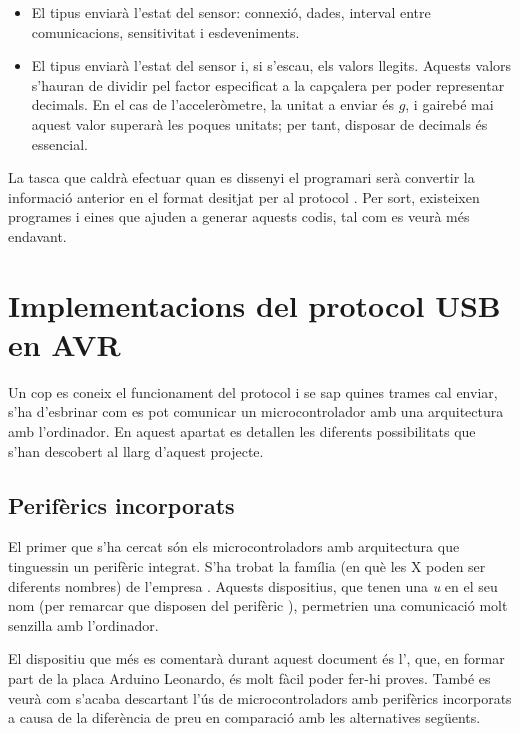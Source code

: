\begin{itemize}
    \item El tipus  enviarà l'estat del sensor: connexió, dades,
    interval entre comunicacions, sensitivitat i esdeveniments.
    \item El tipus  enviarà l'estat del sensor i, si s'escau, els
    valors llegits. Aquests valors s'hauran de dividir pel factor especificat
    a la capçalera per poder representar decimals. En el cas de l'acceleròmetre,
    la unitat a enviar és $g$, i gairebé mai aquest valor superarà
    les poques unitats; per tant, disposar de decimals és essencial.
\end{itemize}

La tasca que caldrà efectuar quan es dissenyi el programari serà convertir la
informació anterior en el format desitjat per al protocol . Per sort,
existeixen programes i eines que ajuden a generar aquests codis, tal com
es veurà més endavant.

\section{Implementacions del protocol USB en AVR}

Un cop es coneix el funcionament del protocol  i se sap quines trames
cal enviar, s'ha d'esbrinar com es pot comunicar un microcontrolador amb
una arquitectura  amb l'ordinador. En aquest apartat es detallen
les diferents possibilitats que s'han descobert al llarg d'aquest projecte.

\subsection{Perifèrics incorporats}

El primer que s'ha cercat són els microcontroladors amb arquitectura  que
tinguessin un perifèric  integrat. S'ha trobat la família
 (en què les X poden ser diferents nombres) de l'empresa
 \cite{AtMega32u4}. Aquests dispositius, que tenen una \emph{u} en
el seu nom (per remarcar que disposen del perifèric ), permetrien
una comunicació molt senzilla amb l'ordinador.

El dispositiu que més es comentarà durant aquest document és l',
que, en formar part de la placa Arduino Leonardo, és molt fàcil poder fer-hi
proves. També es veurà com s'acaba descartant l'ús de microcontroladors amb
perifèrics incorporats a causa de la diferència de preu en comparació amb les
alternatives següents.

